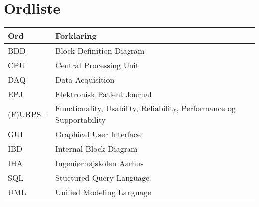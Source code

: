 \chapter{Ordliste}

\begin{longtabu} to 
    Ord &    Forklaring\\
    \toprule 
    BDD & Block Definition Diagram \\	 
    CPU & Central Processing Unit\\   
    DAQ & Data Acquisition\\
    EPJ & Elektronisk Patient Journal\\
    (F)URPS+ & Functionality, Usability, Reliability, Performance og Supportability\\
	GUI & Graphical User Interface\\
	IBD & Internal Block Diagram\\
	IHA & Ingeniørhøjskolen Aarhus\\
	SQL & Stuctured Query Language\\
	UML & Unified Modeling Language\\
	
	
	
\label{forkort}
\end{longtabu}